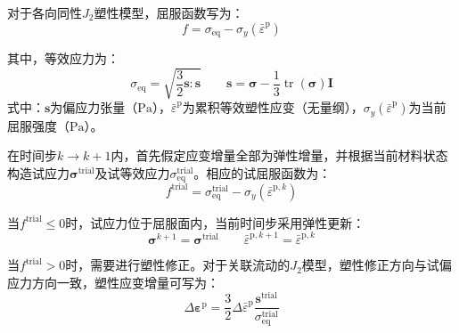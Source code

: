 对于各向同性$J_2$塑性模型，屈服函数写为：
\begin{equation}
	f
	=
	\sigma_{\mathrm{eq}}
	-
	\sigma_y\left(\bar{\varepsilon}^{\mathrm{p}}\right)
	\label{eq:ch4_j2_yield}
\end{equation}

其中，等效应力为：
\begin{equation}
	\sigma_{\mathrm{eq}}
	=
	\sqrt{\frac{3}{2}
		\boldsymbol{s}:\boldsymbol{s}}
	\qquad
	\boldsymbol{s}
	=
	\boldsymbol{\sigma}
	-\frac{1}{3}\operatorname{tr}
	(\boldsymbol{\sigma})\mathbf{I}
	\label{eq:ch4_equivalent_stress}
\end{equation}
\noindent 式中：$\boldsymbol{s}$为偏应力张量（$\mathrm{Pa}$），$\bar{\varepsilon}^{\mathrm{p}}$为累积等效塑性应变（无量纲），$\sigma_y\left(\bar{\varepsilon}^{\mathrm{p}}\right)$为当前屈服强度（$\mathrm{Pa}$）。

在时间步$k\rightarrow k+1$内，首先假定应变增量全部为弹性增量，并根据当前材料状态构造试应力$\boldsymbol{\sigma}^{\mathrm{trial}}$及试等效应力$\sigma_{\mathrm{eq}}^{\mathrm{trial}}$。相应的试屈服函数为：
\begin{equation}
	f^{\mathrm{trial}}
	=
	\sigma_{\mathrm{eq}}^{\mathrm{trial}}
	-
	\sigma_y\left(\bar{\varepsilon}^{\mathrm p,k}\right)
	\label{eq:ch4_trial_yield}
\end{equation}

当$f^{\mathrm{trial}}\leq 0$时，试应力位于屈服面内，当前时间步采用弹性更新：
\begin{equation}
	\boldsymbol{\sigma}^{k+1}
	=
	\boldsymbol{\sigma}^{\mathrm{trial}}
	\qquad
	\bar{\varepsilon}^{\mathrm p,k+1}
	=
	\bar{\varepsilon}^{\mathrm p,k}
	\label{eq:ch4_elastic_update}
\end{equation}

当$f^{\mathrm{trial}}>0$时，需要进行塑性修正。对于关联流动的$J_2$模型，塑性修正方向与试偏应力方向一致，塑性应变增量可写为：
\begin{equation}
	\Delta\boldsymbol{\varepsilon}^{\mathrm{p}}
	=
	\frac{3}{2}
	\Delta\bar{\varepsilon}^{\mathrm{p}}
	\frac{\boldsymbol{s}^{\mathrm{trial}}}
	{\sigma_{\mathrm{eq}}^{\mathrm{trial}}}
	\label{eq:ch4_plastic_strain_increment}
\end{equation}

